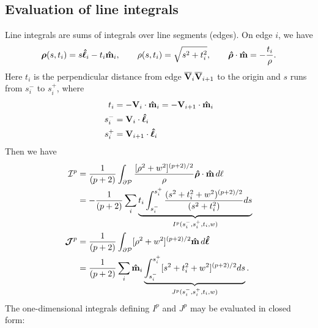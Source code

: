 \documentclass[letterpaper]{article}
\newcommand{\vbhatt}[1]{\boldsymbol{\hat #1}}
\begin{document}
\subsection{Evaluation of line integrals} 

Line integrals are sums of integrals over line segments (edges).
On edge $i$, we have 
$$ \vbrho(s,t_i)=s\vbhatt{\ell}_i - t_i\vbhat{m}_i, 
   \qquad 
   \rho(s,t_i) = \sqrt{s^2 + t_i^2},
   \qquad 
   \vbhatt{\rho}\cdot \vbhat{m} = -\frac{t_i}{\rho}.
$$
Here $t_i$ is the perpendicular distance from edge 
$\overline{\mathbf{V}}_{i}\overline{\mathbf{V}}_{i+1}$ to the origin
and $s$ runs from $s_i^-$ to $s_i^+$, where
\begin{align*}
 t_i   &= -\vb V_i \cdot \vbhat{m}_i = -\vb V_{i+1}\cdot \vbhat{m}_i
\\
 s_i^- &= \vb V_i \cdot \vbhatt{\ell}_i
\\
 s_i^+ &= \vb V_{i+1} \cdot \vbhatt{\ell}_i
\end{align*}
Then we have
\begin{align*}
 \mathcal{I}^p
&=\frac{1}{(p+2)} \int_{\partial \mc P} 
   \frac{ [\rho^2 + w^2]^{(p+2)/2} } { \rho }
   \vbhatt{\rho}\cdot \vbhat{m}\,d\ell
\\
&=-\frac{1}{(p+2)}
   \sum_i \underbrace{t_i\int_{s_i^-}^{s_i^+} 
                \frac{ (s^2 + t_i^2 + w^2)^{(p+2)/2}}{(s^2 + t_i^2)}ds}
               _{I^p(s_i^-, s_i^+, t_i, w)}
\\
 \bmc {J}^p
&= \frac{1}{(p+2)}
   \int_{\partial \mc P} [\rho^2 + w^2]^{(p+2)/2}
   \vbhat{m} \, d\vbhatt{\ell}
\\
&= \frac{1}{(p+2)} \sum_i \vbhat{m}_i 
    \underbrace{ \int_{s_i^-}^{s_i^+} [s^2 + t_i^2 + w^2]^{(p+2)/2}ds}
                 _{J^p(s_i^-, s_i^+, t_i,w)}.
\end{align*}
The one-dimensional integrals defining $I^p$ and $J^p$ may be evaluated
in closed form:
\end{document}
